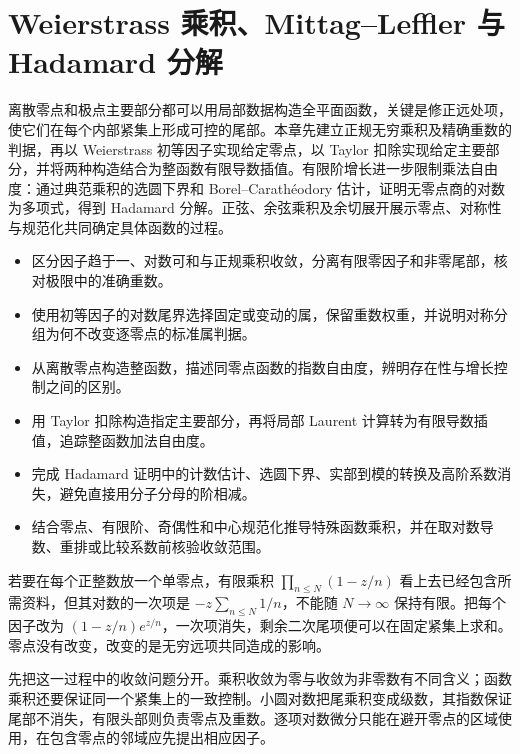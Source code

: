 \chapter{Weierstrass 乘积、Mittag–Leffler 与 Hadamard 分解}
\label{b3:ch:20}
\begin{chapterabstract}
离散零点和极点主要部分都可以用局部数据构造全平面函数，关键是修正远处项，使它们在每个内部紧集上形成可控的尾部。本章先建立正规无穷乘积及精确重数的判据，再以 Weierstrass 初等因子实现给定零点，以 Taylor 扣除实现给定主要部分，并将两种构造结合为整函数有限导数插值。有限阶增长进一步限制乘法自由度：通过典范乘积的选圆下界和 Borel--Carathéodory 估计，证明无零点商的对数为多项式，得到 Hadamard 分解。正弦、余弦乘积及余切展开展示零点、对称性与规范化共同确定具体函数的过程。
\end{chapterabstract}

\begin{learninggoals}
\begin{itemize}
\item 区分因子趋于一、对数可和与正规乘积收敛，分离有限零因子和非零尾部，核对极限中的准确重数。
\item 使用初等因子的对数尾界选择固定或变动的属，保留重数权重，并说明对称分组为何不改变逐零点的标准属判据。
\item 从离散零点构造整函数，描述同零点函数的指数自由度，辨明存在性与增长控制之间的区别。
\item 用 Taylor 扣除构造指定主要部分，再将局部 Laurent 计算转为有限导数插值，追踪整函数加法自由度。
\item 完成 Hadamard 证明中的计数估计、选圆下界、实部到模的转换及高阶系数消失，避免直接用分子分母的阶相减。
\item 结合零点、有限阶、奇偶性和中心规范化推导特殊函数乘积，并在取对数导数、重排或比较系数前核验收敛范围。
\end{itemize}
\end{learninggoals}

若要在每个正整数放一个单零点，有限乘积 \(\prod_{n\le N}(1-z/n)\) 看上去已经包含所需资料，但其对数的一次项是 \(-z\sum_{n\le N}1/n\)，不能随 \(N\to\infty\) 保持有限。把每个因子改为 \((1-z/n)e^{z/n}\)，一次项消失，剩余二次尾项便可以在固定紧集上求和。零点没有改变，改变的是无穷远项共同造成的影响。

\ProseParagraphBreak
{}先把这一过程中的收敛问题分开。乘积收敛为零与收敛为非零数有不同含义；函数乘积还要保证同一个紧集上的一致控制。小圆对数把尾乘积变成级数，其指数保证尾部不消失，有限头部则负责零点及重数。逐项对数微分只能在避开零点的区域使用，在包含零点的邻域应先提出相应因子。

